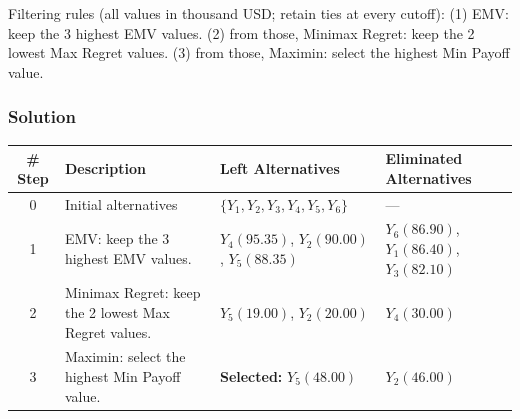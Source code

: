 Filtering rules (all values in thousand USD; retain ties at every cutoff):
(1) EMV: keep the 3 highest EMV values.
(2) from those, Minimax Regret: keep the 2 lowest Max Regret values.
(3) from those, Maximin: select the highest Min Payoff value.


\subsubsection*{Solution}
\label{subsec:c9-insurance-solution}
\begin{center}
\small
\begin{tabularx}{\textwidth}{@{}c >{\raggedright\arraybackslash}X >{\raggedright\arraybackslash}p{} >{\raggedright\arraybackslash}p{}@{}}
\toprule
\# Step & Description & Left Alternatives & Eliminated Alternatives \\
\midrule
0 & Initial alternatives & $\{Y_1,Y_2,Y_3,Y_4,Y_5,Y_6\}$ & --- \\
1 & EMV: keep the 3 highest EMV values. & $Y_4(95.35)$, $Y_2(90.00)$, $Y_5(88.35)$ & $Y_6(86.90)$, $Y_1(86.40)$, $Y_3(82.10)$ \\
2 & Minimax Regret: keep the 2 lowest Max Regret values. & $Y_5(19.00)$, $Y_2(20.00)$ & $Y_4(30.00)$ \\
3 & Maximin: select the highest Min Payoff value. & \textbf{Selected:} $Y_5(48.00)$ & $Y_2(46.00)$ \\
\bottomrule
\end{tabularx}
\end{center}

